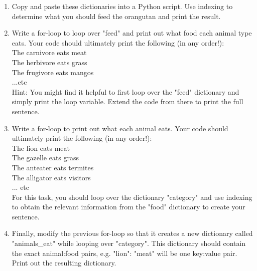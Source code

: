 \documentclass{article}[12pt]
\begin{document}
\begin{enumerate}
	\begin{enumerate}
        \item Copy and paste these dictionaries into a Python script. Use indexing to determine what you should feed the orangutan and print the result.
        \item Write a for-loop to loop over "feed" and print out what food each animal type eats. Your code should ultimately print the following (in any order!):\\
        The carnivore eats meat \\
        The herbivore eats grass \\
        The frugivore eats mangos \\
        ...etc \\
        \noindent Hint: You might find it helpful to first loop over the "feed" dictionary and simply print the loop variable. Extend the code from there to print the full sentence.
        \item Write a for-loop to print out what each animal eats. Your code should ultimately print the following (in any order!):\\
        The lion eats meat \\
        The gazelle eats grass \\ 
        The anteater eats termites \\
        The alligator eats visitors \\ 
            ... etc \\
        \noindent For this task, you should loop over the dictionary "category" and use indexing to obtain the relevant information from the "food" dictionary to create your sentence.
        \item Finally, modify the previous for-loop so that it creates a new dictionary called "animals\_eat" while looping over "category". This dictionary should contain the exact animal:food pairs, e.g. "lion": "meat" will be one key:value pair. Print out the resulting dictionary.
    \end{enumerate}
\end{enumerate}
\end{document}
